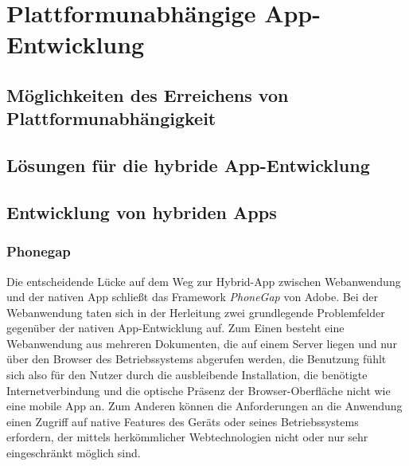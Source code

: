 \section{Plattformunabhängige App-Entwicklung}

\subsection{Möglichkeiten des Erreichens von Plattformunabhängigkeit}
\subsection{Lösungen für die hybride App-Entwicklung}

\subsection{Entwicklung von hybriden Apps}\label{hybrid}

\subsubsection{Phonegap}
Die entscheidende Lücke auf dem Weg zur Hybrid-App zwischen Webanwendung und der nativen App schließt das Framework \emph{PhoneGap} von Adobe. 
Bei der Webanwendung taten sich in der Herleitung zwei grundlegende Problemfelder gegenüber der nativen App-Entwicklung auf. 
Zum Einen besteht eine Webanwendung aus mehreren Dokumenten, die auf einem Server liegen und nur über den Browser des Betriebssystems abgerufen werden, die Benutzung fühlt sich also für den Nutzer durch die ausbleibende Installation, die benötigte Internetverbindung und die optische Präsenz der Browser-Oberfläche nicht wie eine mobile App an. 
Zum Anderen können die Anforderungen an die Anwendung einen Zugriff auf native Features des Geräts oder seines Betriebssystems erfordern, der mittels herkömmlicher Webtechnologien nicht oder nur sehr eingeschränkt möglich sind. 

